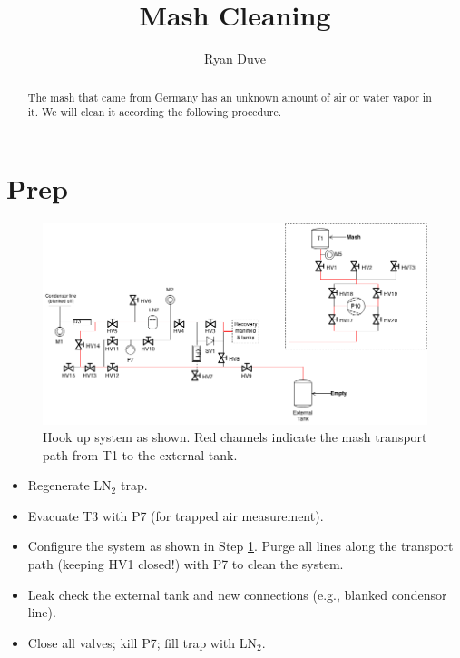 \documentclass[a4paper,10pt]{article}
\title{Mash Cleaning}
\author{Ryan Duve}
\begin{document}
\maketitle

\begin{abstract}
\vspace{.1cm}
\vspace{.1cm}

The mash that came from Germany has an unknown amount of air or water vapor in it.  We will clean it according the following procedure.

\end{abstract}

\section{Prep}
\begin{figure}[htbp!]
 \centering
 \includegraphics[width=\textwidth]{./mash-cleaning-schematic-1.png}
 \caption{Hook up system as shown.  Red channels indicate the mash transport path from T1 to the external tank.}
 \label{a}
\end{figure}

\begin{itemize}
 \item Regenerate LN$_2$ trap.
 \item Evacuate T3 with P7 (for trapped air measurement).
 \item Configure the system as shown in Step \ref{a}. Purge all lines along the transport path (keeping HV1 closed!) with P7 to clean the system.
 \item Leak check the external tank and new connections (e.g., blanked condensor line).
 \item Close all valves; kill P7; fill trap with LN$_2$.
\end{itemize}
\end{document}
